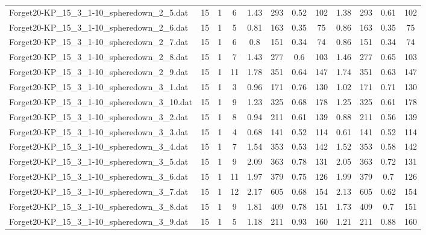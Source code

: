\begin{sidewaystable}[!ht]
{\begin{tabular}{lccccccccccc}
Forget20-KP\_15\_3\_1-10\_spheredown\_2\_5.dat & 15 & 1 & 6 & 1.43 & 293 &  \textcolor{blue2}{0.52} & 102 & 1.38 & 293 & 0.61 & 102 \\
Forget20-KP\_15\_3\_1-10\_spheredown\_2\_6.dat & 15 & 1 & 5 & 0.81 & 163 &  \textcolor{blue2}{0.35} & 75 & 0.86 & 163 &  \textcolor{blue2}{0.35} & 75 \\
Forget20-KP\_15\_3\_1-10\_spheredown\_2\_7.dat & 15 & 1 & 6 & 0.8 & 151 &  \textcolor{blue2}{0.34} & 74 & 0.86 & 151 &  \textcolor{blue2}{0.34} & 74 \\
Forget20-KP\_15\_3\_1-10\_spheredown\_2\_8.dat & 15 & 1 & 7 & 1.43 & 277 &  \textcolor{blue2}{0.6} & 103 & 1.46 & 277 & 0.65 & 103 \\
Forget20-KP\_15\_3\_1-10\_spheredown\_2\_9.dat & 15 & 1 & 11 & 1.78 & 351 & 0.64 & 147 & 1.74 & 351 &  \textcolor{blue2}{0.63} & 147 \\
Forget20-KP\_15\_3\_1-10\_spheredown\_3\_1.dat & 15 & 1 & 3 & 0.96 & 171 & 0.76 & 130 & 1.02 & 171 &  \textcolor{blue2}{0.71} & 130 \\
Forget20-KP\_15\_3\_1-10\_spheredown\_3\_10.dat & 15 & 1 & 9 & 1.23 & 325 & 0.68 & 178 & 1.25 & 325 &  \textcolor{blue2}{0.61} & 178 \\
Forget20-KP\_15\_3\_1-10\_spheredown\_3\_2.dat & 15 & 1 & 8 & 0.94 & 211 & 0.61 & 139 & 0.88 & 211 &  \textcolor{blue2}{0.56} & 139 \\
Forget20-KP\_15\_3\_1-10\_spheredown\_3\_3.dat & 15 & 1 & 4 & 0.68 & 141 &  \textcolor{blue2}{0.52} & 114 & 0.61 & 141 &  \textcolor{blue2}{0.52} & 114 \\
Forget20-KP\_15\_3\_1-10\_spheredown\_3\_4.dat & 15 & 1 & 7 & 1.54 & 353 & 0.53 & 142 & 1.52 & 353 & 0.58 & 142 \\
Forget20-KP\_15\_3\_1-10\_spheredown\_3\_5.dat & 15 & 1 & 9 & 2.09 & 363 & 0.78 & 131 & 2.05 & 363 &  \textcolor{blue2}{0.72} & 131 \\
Forget20-KP\_15\_3\_1-10\_spheredown\_3\_6.dat & 15 & 1 & 11 & 1.97 & 379 & 0.75 & 126 & 1.99 & 379 & 0.7 & 126 \\
Forget20-KP\_15\_3\_1-10\_spheredown\_3\_7.dat & 15 & 1 & 12 & 2.17 & 605 & 0.68 & 154 & 2.13 & 605 &  \textcolor{blue2}{0.62} & 154 \\
Forget20-KP\_15\_3\_1-10\_spheredown\_3\_8.dat & 15 & 1 & 9 & 1.81 & 409 & 0.78 & 151 & 1.73 & 409 &  \textcolor{blue2}{0.7} & 151 \\
Forget20-KP\_15\_3\_1-10\_spheredown\_3\_9.dat & 15 & 1 & 5 & 1.18 & 211 & 0.93 & 160 & 1.21 & 211 & 0.88 & 160 \\

\end{tabular}}
\end{sidewaystable}
